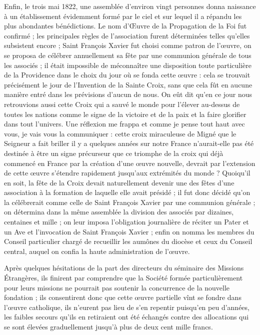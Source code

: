 \documentclass[11pt,a4paper]{report}
\begin{document}
Enfin, le trois mai 1822, une assemblée d'environ vingt personnes donna naissance à un établissement évidemment formé par le ciel et sur lequel il a répandu les plus abondantes bénédictions. Le nom d'Œuvre de la Propagation de la Foi fut confirmé ; les principales règles de l'association furent déterminées telles qu'elles subsistent encore ; Saint François Xavier fut choisi comme patron de l'œuvre, on se proposa de célébrer annuellement sa fête par une communion générale de tous les associés ; il était impossible de méconnaître une disposition toute particulière de la Providence dans le choix du jour où se fonda cette œuvre : cela se trouvait précisément le jour de l'Invention de la Sainte Croix, sans que cela fût en aucune manière entré dans les prévisions d'aucun de nous. On eût dit qu'en ce jour nous retrouvions aussi cette Croix qui a sauvé le monde pour l'élever au-dessus de toutes les nations comme le signe de la victoire et de la paix et la faire glorifier dans tout l'univers. Une réflexion me frappa et comme je pense tout haut avec vous, je vais vous la communiquer : cette croix miraculeuse de Migné que le Seigneur a fait briller il y a quelques années sur notre France n'aurait-elle pas été destinée à être un signe précurseur que ce triomphe de la croix qui déjà commencé en France par la création d'une œuvre nouvelle, devrait par l'extension de cette œuvre s'étendre rapidement jusqu'aux extrémités du monde ? Quoiqu'il en soit, la fête de la Croix devait naturellement devenir une des fêtes d'une association à la formation de laquelle elle avait présidé ; il fut donc décidé qu'on la célébrerait comme celle de Saint François Xavier par une communion générale ; on détermina dans la même assemblée la division des associés par dizaines, centaines et mille ; on leur imposa l'obligation journalière de réciter un Pater et un Ave et l'invocation de Saint François Xavier ; enfin on nomma les membres du Conseil particulier chargé de recueillir les aumônes du diocèse et ceux du Conseil central, auquel on confia la haute administration de l'œuvre.

Après quelques hésitations de la part des directeurs du séminaire des Missions Étrangères, ils finirent par comprendre que la Société formée particulièrement pour leurs missions ne pourrait pas soutenir la concurrence de la nouvelle fondation ; ils consentirent donc que cette œuvre partielle vînt se fondre dans l'œuvre catholique, ils n'eurent pas lieu de s'en repentir puisqu'en peu d'années, les faibles secours qu'ils en retiraient ont été échangés contre des allocations qui se sont élevées graduellement jusqu'à plus de deux cent mille francs.
\end{document}

